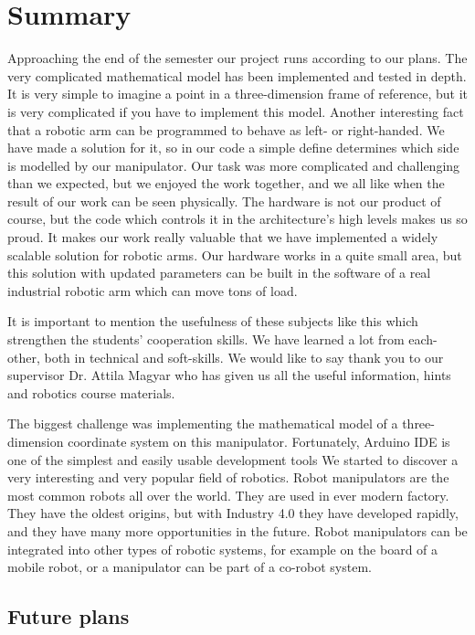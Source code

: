 \chapter{Summary}

	\hspace{15pt}Approaching the end of the semester our project runs according to our plans. The very complicated mathematical model has been implemented and tested in depth. It is very simple to imagine a point in a three-dimension frame of reference, but it is very complicated if you have to implement this model. Another interesting fact that a robotic arm can be programmed to behave as left- or right-handed. We have made a solution for it, so in our code a simple define determines which side is modelled by our manipulator. Our task was more complicated and challenging than we expected, but we enjoyed the work together, and we all like when the result of our work can be seen physically. The hardware is not our product of course, but the code which controls it in the architecture’s high levels makes us so proud. It makes our work really valuable that we have implemented a widely scalable solution for robotic arms. Our hardware works in a quite small area, but this solution with updated parameters can be built in the software of a real industrial robotic arm which can move tons of load.
	
	It is important to mention the usefulness of these subjects like this which strengthen the students’ cooperation skills. We have learned a lot from each-other, both in technical and soft-skills. We would like to say thank you to our supervisor Dr. Attila Magyar who has given us all the useful information, hints and robotics course materials.

	The biggest challenge was implementing the mathematical model of a three-dimension coordinate system on this manipulator. Fortunately, Arduino IDE is one of the simplest and easily usable development tools We started to discover a very interesting and very popular field of robotics. Robot manipulators are the most common robots all over the world. They are used in ever modern factory. They have the oldest origins, but with Industry 4.0 they have developed rapidly, and they have many more opportunities in the future. Robot manipulators can be integrated into other types of robotic systems, for example on the board of a mobile robot, or a manipulator can be part of a co-robot system.


	\section{Future plans}
		
